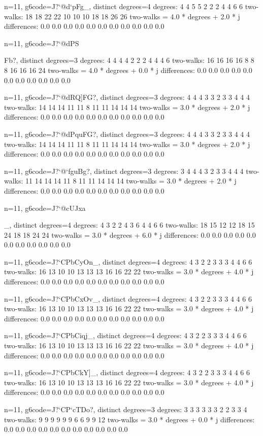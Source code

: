 {{{{{{{{n=11, g6code=J?`@d`p}Fg_, distinct degrees=4
degrees: 4 4 5 5 2 2 2 4 4 6 6 
two-walks: 18 18 22 22 10 10 10 18 18 26 26 
two-walks = 4.0 * degrees + 2.0 * j
differences: 0.0 0.0 0.0 0.0 0.0 0.0 0.0 0.0 0.0 0.0 0.0 

n=11, g6code=J?`@dPS{Fb?, distinct degrees=3
degrees: 4 4 4 4 2 2 2 4 4 4 6 
two-walks: 16 16 16 16 8 8 8 16 16 16 24 
two-walks = 4.0 * degrees + 0.0 * j
differences: 0.0 0.0 0.0 0.0 0.0 0.0 0.0 0.0 0.0 0.0 0.0 

n=11, g6code=J?`@dRQ]FG?, distinct degrees=3
degrees: 4 4 4 3 3 2 3 3 4 4 4 
two-walks: 14 14 14 11 11 8 11 11 14 14 14 
two-walks = 3.0 * degrees + 2.0 * j
differences: 0.0 0.0 0.0 0.0 0.0 0.0 0.0 0.0 0.0 0.0 0.0 

n=11, g6code=J?`@dPquFG?, distinct degrees=3
degrees: 4 4 4 3 3 2 3 3 4 4 4 
two-walks: 14 14 14 11 11 8 11 11 14 14 14 
two-walks = 3.0 * degrees + 2.0 * j
differences: 0.0 0.0 0.0 0.0 0.0 0.0 0.0 0.0 0.0 0.0 0.0 

n=11, g6code=J?`@`fguBg?, distinct degrees=3
degrees: 3 4 4 4 3 2 3 3 4 4 4 
two-walks: 11 14 14 14 11 8 11 11 14 14 14 
two-walks = 3.0 * degrees + 2.0 * j
differences: 0.0 0.0 0.0 0.0 0.0 0.0 0.0 0.0 0.0 0.0 0.0 

n=11, g6code=J?`@cUJxa{_, distinct degrees=4
degrees: 4 3 2 2 4 3 6 4 4 6 6 
two-walks: 18 15 12 12 18 15 24 18 18 24 24 
two-walks = 3.0 * degrees + 6.0 * j
differences: 0.0 0.0 0.0 0.0 0.0 0.0 0.0 0.0 0.0 0.0 0.0 

n=11, g6code=J?`CPbCyOn_, distinct degrees=4
degrees: 4 3 2 2 3 3 3 4 4 6 6 
two-walks: 16 13 10 10 13 13 13 16 16 22 22 
two-walks = 3.0 * degrees + 4.0 * j
differences: 0.0 0.0 0.0 0.0 0.0 0.0 0.0 0.0 0.0 0.0 0.0 

n=11, g6code=J?`CPbCxOv_, distinct degrees=4
degrees: 4 3 2 2 3 3 3 4 4 6 6 
two-walks: 16 13 10 10 13 13 13 16 16 22 22 
two-walks = 3.0 * degrees + 4.0 * j
differences: 0.0 0.0 0.0 0.0 0.0 0.0 0.0 0.0 0.0 0.0 0.0 

n=11, g6code=J?`CPbCiqj_, distinct degrees=4
degrees: 4 3 2 2 3 3 3 4 4 6 6 
two-walks: 16 13 10 10 13 13 13 16 16 22 22 
two-walks = 3.0 * degrees + 4.0 * j
differences: 0.0 0.0 0.0 0.0 0.0 0.0 0.0 0.0 0.0 0.0 0.0 

n=11, g6code=J?`CPbCkY]_, distinct degrees=4
degrees: 4 3 2 2 3 3 3 4 4 6 6 
two-walks: 16 13 10 10 13 13 13 16 16 22 22 
two-walks = 3.0 * degrees + 4.0 * j
differences: 0.0 0.0 0.0 0.0 0.0 0.0 0.0 0.0 0.0 0.0 0.0 

n=11, g6code=J?`CP`cTDo?, distinct degrees=3
degrees: 3 3 3 3 3 3 2 2 3 3 4 
two-walks: 9 9 9 9 9 9 6 6 9 9 12 
two-walks = 3.0 * degrees + 0.0 * j
differences: 0.0 0.0 0.0 0.0 0.0 0.0 0.0 0.0 0.0 0.0 0.0 

}}}}}}}}}

